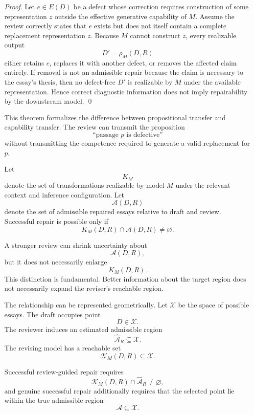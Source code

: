 \documentclass[11pt]{article}
\begin{document}
\begin{proof}
Let \(e\in E(D)\) be a defect whose correction requires construction of some representation \(z\) outside the effective generative capability of \(M\). Assume the review correctly states that \(e\) exists but does not itself contain a complete replacement representation \(z\). Because \(M\) cannot construct \(z\), every realizable output
\[
    D'=\rho_M(D,R)
\]
either retains \(e\), replaces it with another defect, or removes the affected claim entirely. If removal is not an admissible repair because the claim is necessary to the essay's thesis, then no defect-free \(D'\) is realizable by \(M\) under the available representation. Hence correct diagnostic information does not imply repairability by the downstream model. \qed
\end{proof}

This theorem formalizes the difference between propositional transfer and capability transfer. The review can transmit the proposition
\[
    \text{``passage }p\text{ is defective''}
\]
without transmitting the competence required to generate a valid replacement for \(p\).

Let
\[
    K_M
\]
denote the set of transformations realizable by model \(M\) under the relevant context and inference configuration. Let
\[
    \mathcal{A}(D,R)
\]
denote the set of admissible repaired essays relative to draft and review. Successful repair is possible only if
\[
    K_M(D,R)\cap\mathcal{A}(D,R)\neq\varnothing.
\]

A stronger review can shrink uncertainty about
\[
    \mathcal{A}(D,R),
\]
but it does not necessarily enlarge
\[
    K_M(D,R).
\]
This distinction is fundamental. Better information about the target region does not necessarily expand the reviser's reachable region.

The relationship can be represented geometrically. Let \(\mathcal{X}\) be the space of possible essays. The draft occupies point
\[
    D\in\mathcal{X}.
\]
The reviewer induces an estimated admissible region
\[
    \widehat{\mathcal{A}}_R\subseteq\mathcal{X}.
\]
The revising model has a reachable set
\[
    \mathcal{K}_M(D,R)\subseteq\mathcal{X}.
\]

Successful review-guided repair requires
\[
    \mathcal{K}_M(D,R)
    \cap
    \widehat{\mathcal{A}}_R
    \neq
    \varnothing,
\]
and genuine successful repair additionally requires that the selected point lie within the true admissible region
\[
    \mathcal{A}\subseteq\mathcal{X}.
\]
\end{document}
